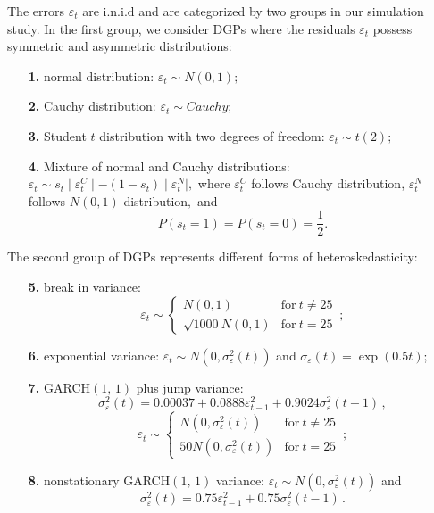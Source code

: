 \documentclass[harvard,11pt]{article}
\begin{document}
The errors $\varepsilon_t$ are i.n.i.d and are categorized by two groups in our simulation study. In the first group, we consider DGPs where the residuals $\varepsilon_t$ possess symmetric and asymmetric distributions:
\begin{enumerate}
\item[\textbf{1.}] normal distribution: $\varepsilon _{t}\sim N(0,1);$
\item[\textbf{2.}] Cauchy distribution: $\varepsilon _{t}\sim Cauchy;$
\item[\textbf{3.}] Student $t$ distribution with two degrees of freedom: $%
\varepsilon _{t}\sim t(2);$
\item[\textbf{4.}] Mixture of normal and Cauchy distributions: $%
\varepsilon _{t}\sim s_{t}\mid \varepsilon _{t}^{C}\mid -(1-s_{t})\mid
\varepsilon _{t}^{N}\mid ,$ where $\varepsilon _{t}^{C}$ follows Cauchy
distribution, $\varepsilon _{t}^{N}$ follows $N(0,1)$ distribution$,$ and 
\begin{equation*}
P\left( s_{t}=1\right) =P\left( s_{t}=0\right) =\frac{1}{2}%
.
\end{equation*}%
\end{enumerate}
The second group of DGPs represents different forms of heteroskedasticity:
\begin{enumerate}
\item[\textbf{5.}] break in variance: 
\begin{equation*}
\varepsilon _{t}\sim \left\{ 
\begin{array}{cc}
N(0,1) & \text{for}\ t\neq 25 \\ 
\sqrt{1000}N(0,1) & \text{for}\ t=25%
\end{array}%
\,;\right.
\end{equation*}%
\item[\textbf{6.}] exponential variance: $\varepsilon_{t}\sim N(0,\sigma_{\varepsilon }^{2}(t))$ and $\sigma _{\varepsilon}(t)=\exp(0.5t)$;
\item[\textbf{7.}] GARCH$(1,\,1)$ plus jump variance:%
\begin{equation*}
\sigma _{\varepsilon }^{2}(t)=0.00037+0.0888\varepsilon
_{t-1}^{2}+0.9024\sigma _{\varepsilon }^{2}(t-1)\,,
\end{equation*}%
\begin{equation*}
\varepsilon _{t}\sim \left\{ 
\begin{array}{cc}
N(0,\sigma _{\varepsilon }^{2}(t)) & \text{for}\ t\neq 25 \\ 
50N(0,\sigma _{\varepsilon }^{2}(t)) & \text{for}\ t=25%
\end{array}%
\right. \,;
\end{equation*}%
\item[\textbf{8.}] nonstationary GARCH$(1,\,1)$ variance: $\varepsilon
_{t}\sim N(0,\sigma _{\varepsilon }^{2}(t))$ and%
\begin{equation*}
\sigma _{\varepsilon }^{2}(t)=0.75\varepsilon _{t-1}^{2}+0.75\sigma
_{\varepsilon }^{2}(t-1)\,.
\end{equation*}%
\end{enumerate}
\end{document}
